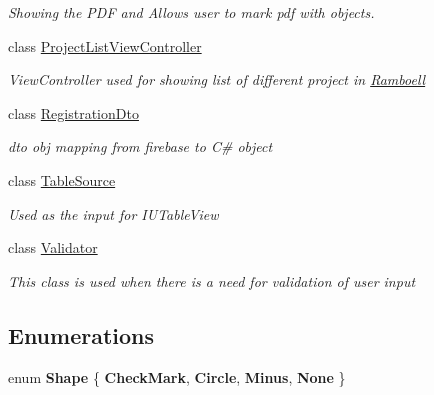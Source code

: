 \begin{DoxyCompactItemize}
\begin{DoxyCompactList}\small\item\em Showing the P\+DF and Allows user to mark pdf with objects. \end{DoxyCompactList}\item 
class \hyperlink{class_ramboell_1_1i_o_s_1_1_project_list_view_controller}{Project\+List\+View\+Controller}
\begin{DoxyCompactList}\small\item\em View\+Controller used for showing list of different project in \hyperlink{namespace_ramboell}{Ramboell} \end{DoxyCompactList}\item 
class \hyperlink{class_ramboell_1_1i_o_s_1_1_registration_dto}{Registration\+Dto}
\begin{DoxyCompactList}\small\item\em dto obj mapping from firebase to C\# object \end{DoxyCompactList}\item 
class \hyperlink{class_ramboell_1_1i_o_s_1_1_table_source}{Table\+Source}
\begin{DoxyCompactList}\small\item\em Used as the input for I\+U\+Table\+View \end{DoxyCompactList}\item 
class \hyperlink{class_ramboell_1_1i_o_s_1_1_validator}{Validator}
\begin{DoxyCompactList}\small\item\em This class is used when there is a need for validation of user input \end{DoxyCompactList}\end{DoxyCompactItemize}
\subsection*{Enumerations}
\begin{DoxyCompactItemize}
\item 
\mbox{\label{namespace_ramboell_1_1i_o_s_a09dbebf981b31cf2a6ca60ce1f4aa190}} 
enum {\bfseries Shape} \{ {\bfseries Check\+Mark}, 
{\bfseries Circle}, 
{\bfseries Minus}, 
{\bfseries None}
 \}
\end{DoxyCompactItemize}
